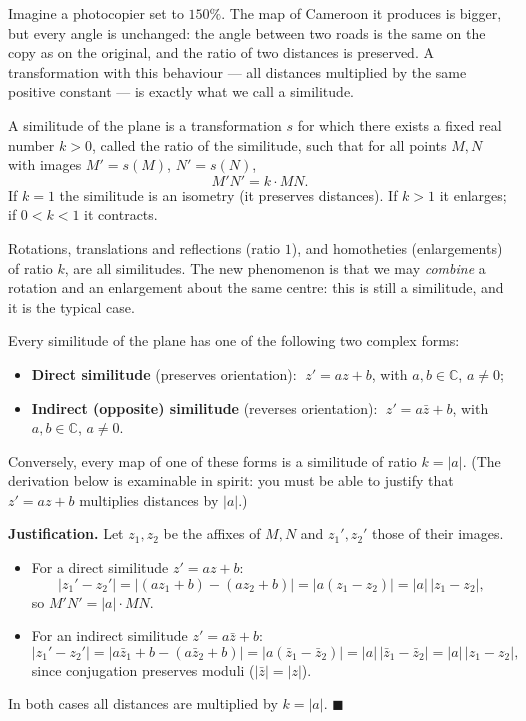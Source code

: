 \documentclass[11pt]{article}
\newcommand{\cle}[1]{{\popxbold\color{popdark}#1}}
\newcounter{popsec}
\newcounter{popsub}
\newcommand{\courssub}[1]{%
  \stepcounter{popsub}%
  \par\vspace{9pt}\noindent{\popxbold\fontsize{11.5}{13}\selectfont\color{popink}{\color{poporange}\thepopsec.\thepopsub}\hspace{6pt}#1}\par\nopagebreak\vspace{4pt}
}
\begin{document}
\begin{experience}
Imagine a photocopier set to $150\%$. The map of Cameroon it produces is bigger, but every angle is unchanged: the angle between two roads is the same on the copy as on the original, and the ratio of two distances is preserved. A transformation with this behaviour --- all distances multiplied by the same positive constant --- is exactly what we call a similitude.
\end{experience}

\begin{definition}
A \cle{similitude} of the plane is a transformation $s$ for which there exists a fixed real number $k > 0$, called the \cle{ratio} of the similitude, such that for all points $M, N$ with images $M' = s(M)$, $N' = s(N)$,
\[ M'N' = k \cdot MN. \]
If $k = 1$ the similitude is an \cle{isometry} (it preserves distances). If $k > 1$ it enlarges; if $0 < k < 1$ it contracts.
\end{definition}

Rotations, translations and reflections (ratio $1$), and homotheties (enlargements) of ratio $k$, are all similitudes. The new phenomenon is that we may \emph{combine} a rotation and an enlargement about the same centre: this is still a similitude, and it is the typical case.

\courssub{Complex Form of a Similitude}

\begin{propriete}
Every similitude of the plane has one of the following two complex forms:
\begin{itemize}
\item \textbf{Direct similitude} (preserves orientation): $\;z' = az + b$, with $a, b \in \mathbb{C}$, $a \neq 0$;
\item \textbf{Indirect (opposite) similitude} (reverses orientation): $\;z' = a\bar{z} + b$, with $a, b \in \mathbb{C}$, $a \neq 0$.
\end{itemize}
Conversely, every map of one of these forms is a similitude of ratio $k = |a|$. (The derivation below is examinable in spirit: you must be able to justify that $z' = az+b$ multiplies distances by $|a|$.)
\end{propriete}

\textbf{Justification.} Let $z_1, z_2$ be the affixes of $M, N$ and $z_1', z_2'$ those of their images.
\begin{itemize}
\item For a direct similitude $z' = az + b$:
\[ |z_1' - z_2'| = |(az_1 + b) - (az_2 + b)| = |a(z_1 - z_2)| = |a|\,|z_1 - z_2|, \]
so $M'N' = |a|\cdot MN$.
\item For an indirect similitude $z' = a\bar{z} + b$:
\[ |z_1' - z_2'| = |a\bar{z}_1 + b - (a\bar{z}_2 + b)| = |a(\bar{z}_1 - \bar{z}_2)| = |a|\,|\bar{z}_1 - \bar{z}_2| = |a|\,|z_1 - z_2|, \]
since conjugation preserves moduli ($|\bar{z}| = |z|$).
\end{itemize}
In both cases all distances are multiplied by $k = |a|$. $\blacksquare$
\end{document}
